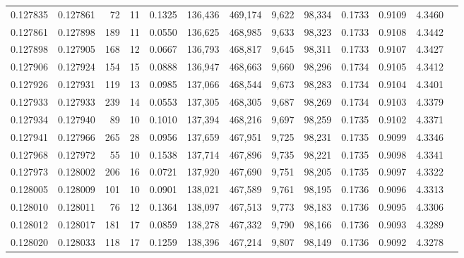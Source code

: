 \begin{tabular}{rrrrrrrrrrrrr}
0.127835 & 0.127861 &    72 &  11 &                                     0.1325 & 136,436 & 469,174 &   9,622 &  98,334 & 0.1733 & 0.9109 & 4.3460 \\
0.127861 & 0.127898 &   189 &  11 &                                     0.0550 & 136,625 & 468,985 &   9,633 &  98,323 & 0.1733 & 0.9108 & 4.3442 \\
0.127898 & 0.127905 &   168 &  12 &                                     0.0667 & 136,793 & 468,817 &   9,645 &  98,311 & 0.1733 & 0.9107 & 4.3427 \\
0.127906 & 0.127924 &   154 &  15 &                                     0.0888 & 136,947 & 468,663 &   9,660 &  98,296 & 0.1734 & 0.9105 & 4.3412 \\
0.127926 & 0.127931 &   119 &  13 &                                     0.0985 & 137,066 & 468,544 &   9,673 &  98,283 & 0.1734 & 0.9104 & 4.3401 \\
0.127933 & 0.127933 &   239 &  14 &                                     0.0553 & 137,305 & 468,305 &   9,687 &  98,269 & 0.1734 & 0.9103 & 4.3379 \\
0.127934 & 0.127940 &    89 &  10 &                                     0.1010 & 137,394 & 468,216 &   9,697 &  98,259 & 0.1735 & 0.9102 & 4.3371 \\
0.127941 & 0.127966 &   265 &  28 &                                     0.0956 & 137,659 & 467,951 &   9,725 &  98,231 & 0.1735 & 0.9099 & 4.3346 \\
0.127968 & 0.127972 &    55 &  10 &                                     0.1538 & 137,714 & 467,896 &   9,735 &  98,221 & 0.1735 & 0.9098 & 4.3341 \\
0.127973 & 0.128002 &   206 &  16 &                                     0.0721 & 137,920 & 467,690 &   9,751 &  98,205 & 0.1735 & 0.9097 & 4.3322 \\
0.128005 & 0.128009 &   101 &  10 &                                     0.0901 & 138,021 & 467,589 &   9,761 &  98,195 & 0.1736 & 0.9096 & 4.3313 \\
0.128010 & 0.128011 &    76 &  12 &                                     0.1364 & 138,097 & 467,513 &   9,773 &  98,183 & 0.1736 & 0.9095 & 4.3306 \\
0.128012 & 0.128017 &   181 &  17 &                                     0.0859 & 138,278 & 467,332 &   9,790 &  98,166 & 0.1736 & 0.9093 & 4.3289 \\
0.128020 & 0.128033 &   118 &  17 &                                     0.1259 & 138,396 & 467,214 &   9,807 &  98,149 & 0.1736 & 0.9092 & 4.3278 \\

\end{tabular}
